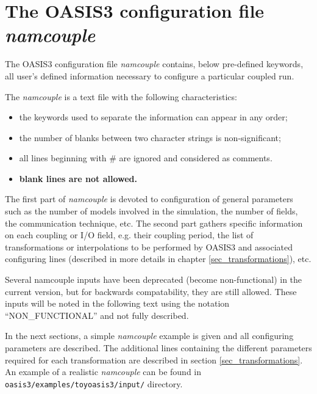 \newpage
\chapter{The OASIS3 configuration file {\it namcouple}}
\label{sec_namcouple}

The OASIS3 configuration file {\em namcouple} contains, below
pre-defined keywords, all user's
defined information necessary to configure a particular coupled
run. 

The {\it namcouple} is a text file with the following
characteristics:

\begin{itemize}
\item the keywords used to separate the information
can appear in any order;
\item the number of blanks between two character strings is
non-significant; 
\item all lines beginning with \# are ignored and considered as
comments.
\item {\bf blank lines are not allowed.}
\end{itemize}
\vspace*{0.5cm}

The first part of {\em namcouple } is devoted to configuration of
general parameters such as the number of models involved in the
simulation, the number of fields, the communication technique, etc.
The second part gathers specific information on each coupling or I/O
field, e.g. their coupling period, the list of transformations or
interpolations to be performed by OASIS3 and associated
configuring lines (described in more details in chapter
\ref{sec_transformations}), etc.

\vspace*{0.5cm}

Several namcouple inputs have been deprecated (become non-functional)
in the current version,  but for backwards compatability, they are still 
allowed.  These inputs will be noted in the following text using the
notation ``NON\_FUNCTIONAL'' and not fully described.

\vspace*{0.5cm}

In the next sections, a simple {\it namcouple} example is given and
all configuring parameters are described. The additional lines
containing the different parameters required for each transformation
are described in section \ref{sec_transformations}. An example of a
realistic {\em namcouple} can be found in 
{\tt
oasis3/examples/toyoasis3/input/} directory.

